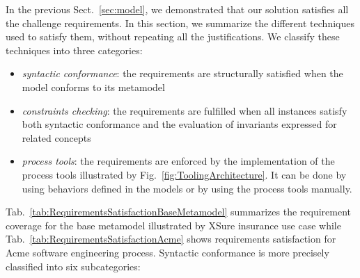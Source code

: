 
In the previous Sect.~\ref{sec:model}, we demonstrated that our solution
satisfies all the challenge requirements. In this section, we summarize the
different techniques used to satisfy them, without repeating all the
justifications. We classify these techniques into three categories:
\begin{itemize}
    \item \emph{syntactic conformance}: the requirements are structurally
      satisfied when the model conforms to its metamodel

    \item \emph{constraints checking}: the requirements are fulfilled when all
      instances satisfy both syntactic conformance and the evaluation of
      invariants expressed for related concepts

    \item \emph{process tools}: the requirements are enforced by the
      implementation of the process tools illustrated by
      Fig.~\ref{fig:ToolingArchitecture}. It can be done by using behaviors
      defined in the models or by using the process tools manually.

\end{itemize}


Tab.~\ref{tab:RequirementsSatisfactionBaseMetamodel} summarizes the requirement
coverage for the base metamodel illustrated by XSure insurance use case while
Tab.~\ref{tab:RequirementsSatisfactionAcme} shows requirements satisfaction for
Acme software engineering process. Syntactic conformance is more precisely
classified into six subcategories:

